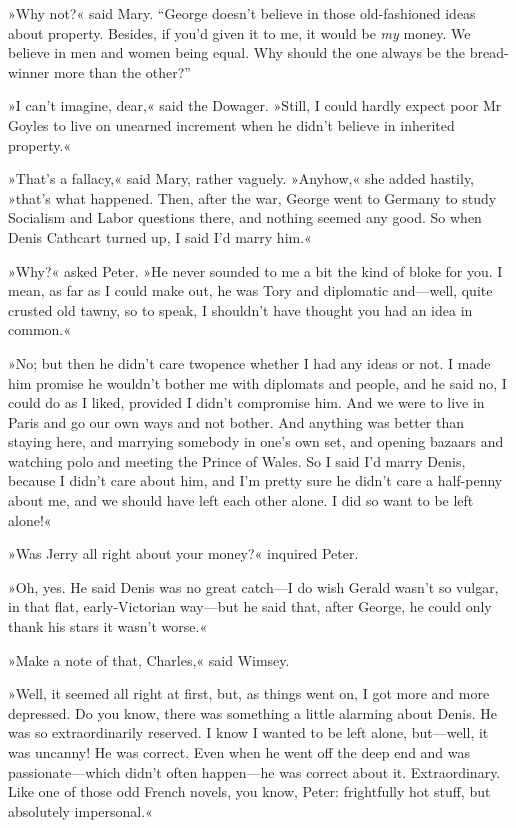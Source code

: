 »Why not?« said Mary. \enquote{George doesn't believe in those old-fashioned ideas about property. Besides, if you'd given it to me, it would be \textit{my} money. We believe in men and women being equal. Why should the one always be the bread-winner more than the other?}

»I can't imagine, dear,« said the Dowager. »Still, I could hardly expect poor Mr Goyles to live on unearned increment when he didn't believe in inherited property.«

»That's a fallacy,« said Mary, rather vaguely. »Anyhow,« she added hastily, »that's what happened. Then, after the war, George went to Germany to study Socialism and Labor questions there, and nothing seemed any good. So when Denis Cathcart turned up, I said I'd marry him.«

»Why?« asked Peter. »He never sounded to me a bit the kind of bloke for you. I mean, as far as I could make out, he was Tory and diplomatic and\allowbreak---\allowbreak well, quite crusted old tawny, so to speak, I shouldn't have thought you had an idea in common.«

»No; but then he didn't care twopence whether I had any ideas or not. I made him promise he wouldn't bother me with diplomats and people, and he said no, I could do as I liked, provided I didn't compromise him.  And we were to live in Paris and go our own ways and not bother. And anything was better than staying here, and marrying somebody in one's own set, and opening bazaars and watching polo and meeting the Prince of Wales. So I said I'd marry Denis, because I didn't care about him, and I'm pretty sure he didn't care a half-penny about me, and we should have left each other alone. I did so want to be left alone!«

»Was Jerry all right about your money?« inquired Peter.

»Oh, yes. He said Denis was no great catch\allowbreak---\allowbreak I do wish Gerald wasn't so vulgar, in that flat, early-Victorian way\allowbreak---\allowbreak but he said that, after George, he could only thank his stars it wasn't worse.«

»Make a note of that, Charles,« said Wimsey.

»Well, it seemed all right at first, but, as things went on, I got more and more depressed. Do you know, there was something a little alarming about Denis. He was so extraordinarily reserved. I know I wanted to be left alone, but\allowbreak---\allowbreak well, it was uncanny! He was correct. Even when he went off the deep end and was passionate\allowbreak---\allowbreak which didn't often happen\allowbreak---\allowbreak he was correct about it. Extraordinary. Like one of those odd French novels, you know, Peter: frightfully hot stuff, but absolutely impersonal.«

